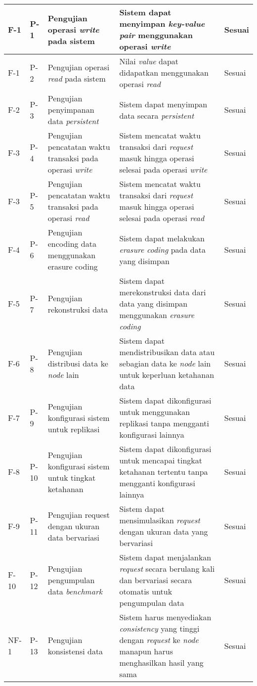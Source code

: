 \begin{longtable}{|l|l|p{3cm}|p{3cm}|l|}
F-1 & P-1 & Pengujian operasi \textit{write} pada sistem & Sistem dapat menyimpan \textit{key-value pair} menggunakan operasi \textit{write} & Sesuai \\ \hline
F-1 & P-2 & Pengujian operasi \textit{read} pada sistem & Nilai \textit{value} dapat didapatkan menggunakan operasi \textit{read} & Sesuai \\ \hline
F-2 & P-3 & Pengujian penyimpanan data \textit{persistent} & Sistem dapat menyimpan data secara \textit{persistent} & Sesuai \\ \hline
F-3 & P-4 & Pengujian pencatatan waktu transaksi pada operasi \textit{write} & Sistem mencatat waktu transaksi dari \textit{request} masuk hingga operasi selesai pada operasi \textit{write} & Sesuai \\ \hline
F-3 & P-5 & Pengujian pencatatan waktu transaksi pada operasi \textit{read} & Sistem mencatat waktu transaksi dari \textit{request} masuk hingga operasi selesai pada operasi \textit{read} & Sesuai \\ \hline
F-4 & P-6 & Pengujian encoding data menggunakan erasure coding & Sistem dapat melakukan \textit{erasure coding} pada data yang disimpan & Sesuai \\ \hline
F-5 & P-7 & Pengujian rekonstruksi data & Sistem dapat merekonstruksi data dari data yang disimpan menggunakan \textit{erasure coding} & Sesuai \\ \hline
F-6 & P-8 & Pengujian distribusi data ke \textit{node} lain & Sistem dapat mendistribusikan data atau sebagian data ke \textit{node} lain untuk keperluan ketahanan data & Sesuai \\ \hline
F-7 & P-9 & Pengujian konfigurasi sistem untuk replikasi & Sistem dapat dikonfigurasi untuk menggunakan replikasi tanpa mengganti konfigurasi lainnya & Sesuai \\ \hline
F-8 & P-10 & Pengujian konfigurasi sistem untuk tingkat ketahanan & Sistem dapat dikonfigurasi untuk mencapai tingkat ketahanan tertentu tanpa mengganti konfigurasi lainnya & Sesuai \\ \hline
F-9 & P-11 & Pengujian request dengan ukuran data bervariasi & Sistem dapat mensimulasikan \textit{request} dengan ukuran data yang bervariasi & Sesuai \\ \hline
F-10 & P-12 & Pengujian pengumpulan data \textit{benchmark} & Sistem dapat menjalankan \textit{request} secara berulang kali dan bervariasi secara otomatis untuk pengumpulan data & Sesuai \\ \hline
NF-1 & P-13 & Pengujian konsistensi data & Sistem harus menyediakan \textit{consistency} yang tinggi dengan \textit{request} ke \textit{node} manapun harus menghasilkan hasil yang sama & Sesuai \\ \hline
\end{longtable}